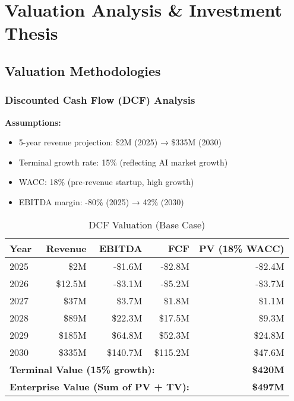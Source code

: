 \documentclass[11pt,letterpaper]{article}
\begin{document}
\newpage

\section{Valuation Analysis \& Investment Thesis}

\subsection{Valuation Methodologies}

\subsubsection{Discounted Cash Flow (DCF) Analysis}

\textbf{Assumptions:}
\begin{itemize}
    \item 5-year revenue projection: \$2M (2025) → \$335M (2030)
    \item Terminal growth rate: 15\% (reflecting AI market growth)
    \item WACC: 18\% (pre-revenue startup, high growth)
    \item EBITDA margin: -80\% (2025) → 42\% (2030)
\end{itemize}

\begin{table}[H]
\centering
\begin{tabularx}{0.9\textwidth}{Xrrrr}
\toprule
\textbf{Year} & \textbf{Revenue} & \textbf{EBITDA} & \textbf{FCF} & \textbf{PV (18\% WACC)} \\
\midrule
2025 & \$2M & -\$1.6M & -\$2.8M & -\$2.4M \\
2026 & \$12.5M & -\$3.1M & -\$5.2M & -\$3.7M \\
2027 & \$37M & \$3.7M & \$1.8M & \$1.1M \\
2028 & \$89M & \$22.3M & \$17.5M & \$9.3M \\
2029 & \$185M & \$64.8M & \$52.3M & \$24.8M \\
2030 & \$335M & \$140.7M & \$115.2M & \$47.6M \\
\midrule
\multicolumn{4}{l}{\textbf{Terminal Value (15\% growth):}} & \textbf{\$420M} \\
\midrule
\multicolumn{4}{l}{\textbf{Enterprise Value (Sum of PV + TV):}} & \textbf{\$497M} \\
\bottomrule
\end{tabularx}
\caption{DCF Valuation (Base Case)}
\end{table}
\end{document}
